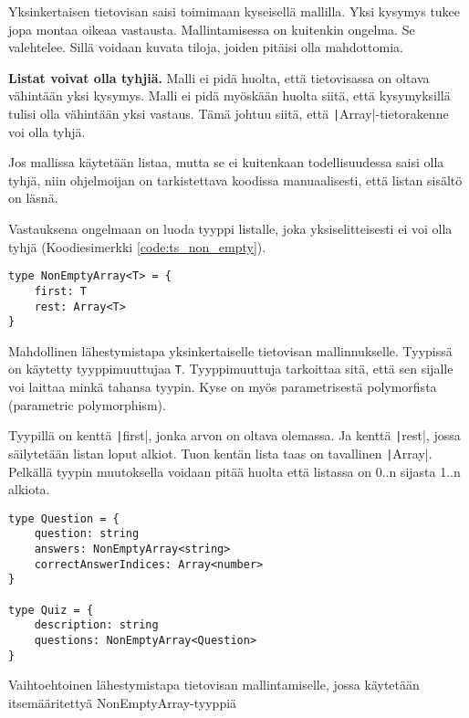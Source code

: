 Yksinkertaisen tietovisan saisi toimimaan kyseisellä mallilla. Yksi kysymys tukee jopa montaa oikeaa vastausta.
Mallintamisessa on kuitenkin ongelma. Se valehtelee. Sillä voidaan kuvata tiloja, joiden pitäisi olla mahdottomia.

\textbf{Listat voivat olla tyhjiä.} Malli ei pidä huolta, että tietovisassa on oltava vähintään yksi kysymys. Malli ei pidä myöskään huolta siitä, että kysymyksillä tulisi olla vähintään yksi vastaus. Tämä johtuu siitä, että \texttt|Array|-tietorakenne voi olla tyhjä.

Jos mallissa käytetään listaa, mutta se ei kuitenkaan todellisuudessa saisi olla tyhjä, niin ohjelmoijan on tarkistettava koodissa manuaalisesti, että listan sisältö on läsnä.

Vastauksena ongelmaan on luoda tyyppi listalle, joka yksiselitteisesti ei voi olla tyhjä (Koodiesimerkki \ref{code:ts_non_empty}).

\begin{code}
    \begin{verbatim}
type NonEmptyArray<T> = {
    first: T
    rest: Array<T>
}
    \end{verbatim}
    \caption{Mahdollinen lähestymistapa yksinkertaiselle tietovisan mallinnukselle. Tyypissä on käytetty tyyppimuuttujaa \texttt{T}. Tyyppimuuttuja tarkoittaa sitä, että sen sijalle voi laittaa minkä tahansa tyypin. Kyse on myös parametrisestä polymorfista (parametric polymorphism).}
    \label{code:ts_non_empty}
\end{code}

Tyypillä on kenttä \texttt|first|, jonka arvon on oltava olemassa. Ja kenttä \texttt|rest|, jossa säilytetään listan loput alkiot. Tuon kentän lista taas on tavallinen \texttt|Array|. Pelkällä tyypin muutoksella voidaan pitää huolta että listassa on 0..n sijasta 1..n alkiota.

\begin{code}
    \begin{verbatim}
type Question = {
    question: string
    answers: NonEmptyArray<string> 
    correctAnswerIndices: Array<number>
}

type Quiz = {
    description: string
    questions: NonEmptyArray<Question> 
}       
    \end{verbatim}
    \caption{Vaihtoehtoinen lähestymistapa tietovisan mallintamiselle, jossa käytetään itsemääritettyä NonEmptyArray-tyyppiä}
    \label{code:ts_non_empty_quiz}
\end{code}

